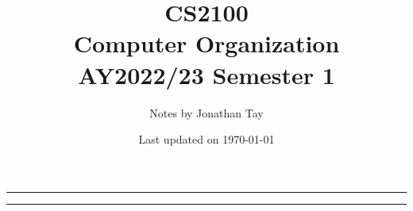 \documentclass{article}
\title{\vspace{-1cm}\textbf{CS2100 \\[0.25em] Computer Organization} \\[2em] \Large AY2022/23 Semester 1 \\[1em]}
\author{Notes by Jonathan Tay}
\date{Last updated on \today}
\newcommand{\pageline}[1]{\par\noindent\rule{\textwidth}{#1}}
\begin{document}
    \maketitle
    \pageline{1.5pt}
    \renewcommand{\baselinestretch}{0.75}\normalsize
    \tableofcontents
    \renewcommand{\baselinestretch}{1.1}\normalsize
    \pageline{1.5pt}

    \newpage
    \begin{multicols*}{2}
        
    \end{multicols*}
\end{document}
